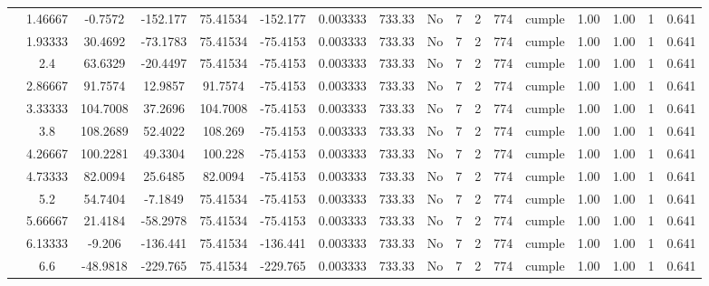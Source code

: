 \begin{table}[H]
{\begin{tabular}{|c|c|c|c|c|c|c|c|c|c|c|c|c|c|c|c|c|}
\cline{2-17}    & 1.46667 & -0.7572 & -152.177 & 75.41534 & -152.177 & 0.003333 & 733.33 & No  & 7   & 2   & 774 & \cellcolor[rgb]{ .776,  .937,  .808}cumple & 1.00 & 1.00 & 1   & 0.641 \bigstrut\\
\cline{2-17}    & 1.93333 & 30.4692 & -73.1783 & 75.41534 & -75.4153 & 0.003333 & 733.33 & No  & 7   & 2   & 774 & \cellcolor[rgb]{ .776,  .937,  .808}cumple & 1.00 & 1.00 & 1   & 0.641 \bigstrut\\
\cline{2-17}    & 2.4 & 63.6329 & -20.4497 & 75.41534 & -75.4153 & 0.003333 & 733.33 & No  & 7   & 2   & 774 & \cellcolor[rgb]{ .776,  .937,  .808}cumple & 1.00 & 1.00 & 1   & 0.641 \bigstrut\\
\cline{2-17}    & 2.86667 & 91.7574 & 12.9857 & 91.7574 & -75.4153 & 0.003333 & 733.33 & No  & 7   & 2   & 774 & \cellcolor[rgb]{ .776,  .937,  .808}cumple & 1.00 & 1.00 & 1   & 0.641 \bigstrut\\
\cline{2-17}    & 3.33333 & 104.7008 & 37.2696 & 104.7008 & -75.4153 & 0.003333 & 733.33 & No  & 7   & 2   & 774 & \cellcolor[rgb]{ .776,  .937,  .808}cumple & 1.00 & 1.00 & 1   & 0.641 \bigstrut\\
\cline{2-17}    & 3.8 & 108.2689 & 52.4022 & 108.269 & -75.4153 & 0.003333 & 733.33 & No  & 7   & 2   & 774 & \cellcolor[rgb]{ .776,  .937,  .808}cumple & 1.00 & 1.00 & 1   & 0.641 \bigstrut\\
\cline{2-17}    & 4.26667 & 100.2281 & 49.3304 & 100.228 & -75.4153 & 0.003333 & 733.33 & No  & 7   & 2   & 774 & \cellcolor[rgb]{ .776,  .937,  .808}cumple & 1.00 & 1.00 & 1   & 0.641 \bigstrut\\
\cline{2-17}    & 4.73333 & 82.0094 & 25.6485 & 82.0094 & -75.4153 & 0.003333 & 733.33 & No  & 7   & 2   & 774 & \cellcolor[rgb]{ .776,  .937,  .808}cumple & 1.00 & 1.00 & 1   & 0.641 \bigstrut\\
\cline{2-17}    & 5.2 & 54.7404 & -7.1849 & 75.41534 & -75.4153 & 0.003333 & 733.33 & No  & 7   & 2   & 774 & \cellcolor[rgb]{ .776,  .937,  .808}cumple & 1.00 & 1.00 & 1   & 0.641 \bigstrut\\
\cline{2-17}    & 5.66667 & 21.4184 & -58.2978 & 75.41534 & -75.4153 & 0.003333 & 733.33 & No  & 7   & 2   & 774 & \cellcolor[rgb]{ .776,  .937,  .808}cumple & 1.00 & 1.00 & 1   & 0.641 \bigstrut\\
\cline{2-17}    & 6.13333 & -9.206 & -136.441 & 75.41534 & -136.441 & 0.003333 & 733.33 & No  & 7   & 2   & 774 & \cellcolor[rgb]{ .776,  .937,  .808}cumple & 1.00 & 1.00 & 1   & 0.641 \bigstrut\\
\cline{2-17}    & \cellcolor[rgb]{ .851,  .882,  .949}6.6 & -48.9818 & -229.765 & 75.41534 & -229.765 & 0.003333 & 733.33 & No  & 7   & 2   & 774 & \cellcolor[rgb]{ .776,  .937,  .808}cumple & 1.00 & 1.00 & 1   & 0.641 \bigstrut\\

\end{tabular}}
\end{table}
